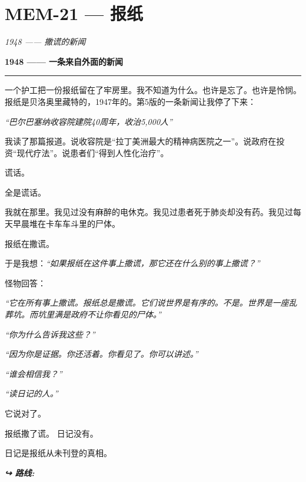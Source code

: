 \section*{\textbf{MEM-21} --- 报纸}

\noindent \textit{1948 —— 撒谎的新闻}

\noindent \textbf{1948 —— 一条来自外面的新闻}

\vspace{0.5em}\noindent\rule{\textwidth}{0.5pt}\vspace{0.5em}

\noindent 一个护工把一份报纸留在了牢房里。我不知道为什么。也许是忘了。也许是怜悯。报纸是贝洛奥里藏特的，1947年的。第5版的一条新闻让我停了下来：

\noindent \textit{“巴尔巴塞纳收容院建院40周年，收治5,000人”}

\noindent 我读了那篇报道。说收容院是“拉丁美洲最大的精神病医院之一”。说政府在投资“现代疗法”。说患者们“得到人性化治疗”。

\noindent 谎话。

\noindent 全是谎话。

\noindent 我就在那里。我见过没有麻醉的电休克。我见过患者死于肺炎却没有药。我见过每天早晨堆在卡车车斗里的尸体。

\noindent 报纸在撒谎。

\noindent 于是我想：\textit{“如果报纸在这件事上撒谎，那它还在什么别的事上撒谎？”}

\noindent 怪物回答：

\noindent \textit{“它在所有事上撒谎。报纸总是撒谎。它们说世界是有序的。不是。世界是一座乱葬坑。而坑里满是政府不让你看见的尸体。”}

\noindent \textit{“你为什么告诉我这些？”}

\noindent \textit{“因为你是证据。你还活着。你看见了。你可以讲述。”}

\noindent \textit{“谁会相信我？”}

\noindent \textit{“读日记的人。”}

\noindent 它说对了。

\noindent 报纸撒了谎。
日记没有。

\noindent 日记是报纸从未刊登的真相。

\vspace{0.5em}
\noindent\textit{\textbf{↪ 路线:}  \rotasep {}}

